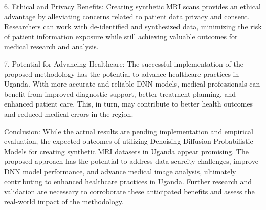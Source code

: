 6. Ethical and Privacy Benefits:
Creating synthetic MRI scans provides an ethical advantage by alleviating concerns related to patient data privacy and consent. Researchers can work with de-identified and synthesized data, minimizing the risk of patient information exposure while still achieving valuable outcomes for medical research and analysis.

7. Potential for Advancing Healthcare:
The successful implementation of the proposed methodology has the potential to advance healthcare practices in Uganda. With more accurate and reliable DNN models, medical professionals can benefit from improved diagnostic support, better treatment planning, and enhanced patient care. This, in turn, may contribute to better health outcomes and reduced medical errors in the region.

Conclusion:
While the actual results are pending implementation and empirical evaluation, the expected outcomes of utilizing Denoising Diffusion Probabilistic Models for creating synthetic MRI datasets in Uganda appear promising. The proposed approach has the potential to address data scarcity challenges, improve DNN model performance, and advance medical image analysis, ultimately contributing to enhanced healthcare practices in Uganda. Further research and validation are necessary to corroborate these anticipated benefits and assess the real-world impact of the methodology.
